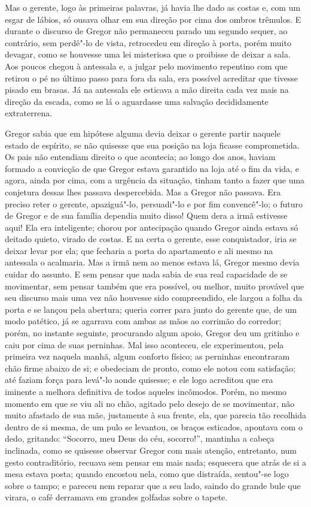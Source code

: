 Mas o gerente, logo às primeiras palavras, já havia lhe dado as costas e,
com um esgar de lábios, só ousava olhar em sua direção por cima dos ombros
trêmulos. E durante o discurso de Gregor não permaneceu parado um segundo
sequer, ao contrário, sem perdê"-lo de vista, retrocedeu em direção à
porta, porém muito devagar, como se houvesse uma lei misteriosa que o
proibisse de deixar a sala. Aos poucos chegou à antessala e, a julgar pelo
movimento repentino com que retirou o pé no último passo para fora da
sala, era possível acreditar que tivesse pisado em brasas. Já na
antessala ele esticava a mão direita cada vez mais na direção da escada,
como se lá o aguardasse uma salvação decididamente extraterrena.

Gregor sabia que em hipótese alguma devia deixar o gerente partir naquele
estado de espírito, se não quisesse que sua posição na loja ficasse
comprometida. Os pais não entendiam direito o que acontecia; ao longo dos
anos, haviam formado a convicção de que Gregor estava garantido na loja
até o fim da vida, e agora, ainda por cima, com a urgência da situação,
tinham tanto a fazer que uma conjetura dessas lhes passava despercebida.
Mas a Gregor não passava. Era preciso reter o gerente, apaziguá"-lo,
persuadi"-lo e por fim convencê"-lo; o futuro de Gregor e de sua família
dependia muito disso! Quem dera a irmã estivesse aqui! Ela era
inteligente; chorou por antecipação quando Gregor ainda estava só deitado
quieto, virado de costas. E na certa o gerente, esse conquistador, iria se
deixar levar por ela; que fecharia a porta do apartamento e ali mesmo na
antessala o acalmaria. Mas a irmã nem ao menos estava lá, Gregor mesmo
devia cuidar do assunto. E sem pensar que nada sabia de sua real
capacidade de se movimentar, sem pensar também que era possível, ou
melhor, muito provável que seu discurso mais uma vez não houvesse sido
compreendido, ele largou a folha da porta e se lançou pela abertura;
queria correr para junto do gerente que, de um modo patético, já se
agarrava com ambas as mãos ao corrimão do corredor; porém, no instante
seguinte, procurando algum apoio, Gregor deu um gritinho e caiu por cima
de suas perninhas. Mal isso aconteceu, ele experimentou, pela primeira vez
naquela manhã, algum conforto físico; as perninhas encontraram chão firme
abaixo de si; e obedeciam de pronto, como ele notou com satisfação; até
faziam força para levá"-lo aonde quisesse; e ele logo acreditou que era
iminente a melhora definitiva de todos aqueles incômodos. Porém, no mesmo
momento em que se viu ali no chão, agitado pelo desejo de se movimentar,
não muito afastado de sua mãe, justamente à sua frente, ela, que parecia
tão recolhida dentro de si mesma, de um pulo se levantou, os braços
esticados, apontava com o dedo, gritando: “Socorro, meu Deus do céu,
socorro!”, mantinha a cabeça inclinada, como se quisesse observar Gregor
com mais atenção, entretanto, num gesto contraditório, recuava sem pensar em
mais nada; esquecera que atrás de si a mesa estava posta; quando encostou
nela, como que distraída, sentou"-se logo sobre o tampo; e pareceu nem
reparar que a seu lado, saindo do grande bule que virara, o café derramava
em grandes golfadas sobre o tapete.

